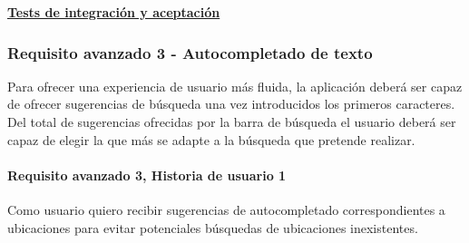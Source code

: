 \documentclass[../ei103948-project-documentation.tex]{subfiles}
\begin{document}
								\begin{center}
									\textbf{\underline{Tests de integración y aceptación}}
								\end{center}

								\testAvanzadoG

				
					\newpage

				\subsubsection{Requisito avanzado 3 - Autocompletado de texto}
					Para ofrecer una experiencia de usuario más fluida, la aplicación deberá ser capaz de ofrecer sugerencias de búsqueda una vez introducidos los primeros caracteres. Del total de sugerencias ofrecidas por la barra de búsqueda el usuario deberá ser capaz de elegir la que más se adapte a la búsqueda que pretende realizar.

					\paragraph{Requisito avanzado 3, Historia de usuario 1}
								Como usuario quiero recibir sugerencias de autocompletado correspondientes a ubicaciones para evitar potenciales búsquedas de ubicaciones inexistentes.
\end{document}
